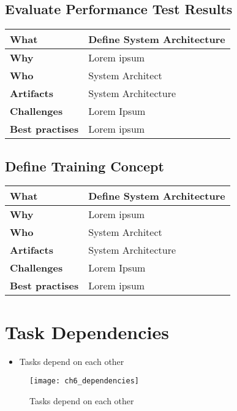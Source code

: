 \subsection{Evaluate Performance Test Results}
 \label{table:ch6_Task_Define_System_Architect}
\begin{tabular}
	{|m{3cm}|m{10cm}|} \hline \bfseries What & Define System Architecture\\
	\hline \bfseries Why & Lorem ipsum\\
	\hline \bfseries Who & System Architect\\
	\hline \bfseries Artifacts & System Architecture\\
	\hline \bfseries Challenges & Lorem Ipsum\\
	\hline \bfseries Best practises & Lorem ipsum\\
	\hline 
\end{tabular}

\subsection{Define Training Concept}
 \label{table:ch6_Task_Define_System_Architect}
\begin{tabular}
	{|m{3cm}|m{10cm}|} \hline \bfseries What & Define System Architecture\\
	\hline \bfseries Why & Lorem ipsum\\
	\hline \bfseries Who & System Architect\\
	\hline \bfseries Artifacts & System Architecture\\
	\hline \bfseries Challenges & Lorem Ipsum\\
	\hline \bfseries Best practises & Lorem ipsum\\
	\hline 
\end{tabular}

\section{Task Dependencies}

\begin{itemize}
	\item Tasks depend on each other
\end{itemize}

\begin{figure}
	[htpb] \centering 
	\texttt{[image: ch6\_dependencies]} 
	\caption{Tasks depend on each other} 
	\label{fig:ch6_dependencies} 
\end{figure}

